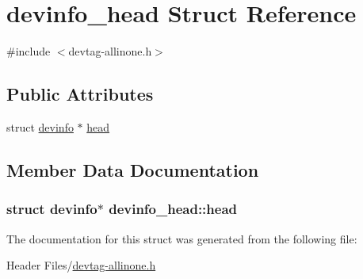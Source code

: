 \hypertarget{structdevinfo__head}{\section{devinfo\-\_\-head \-Struct \-Reference}
\label{structdevinfo__head}
}


{\ttfamily \#include $<$devtag-\/allinone.\-h$>$}

\subsection*{\-Public \-Attributes}
\begin{DoxyCompactItemize}
\item 
struct \hyperlink{structdevinfo}{devinfo} $\ast$ \hyperlink{structdevinfo__head_a17d6f51581ff5e86b8f8556c2a9cd530}{head}
\end{DoxyCompactItemize}


\subsection{\-Member \-Data \-Documentation}
\hypertarget{structdevinfo__head_a17d6f51581ff5e86b8f8556c2a9cd530}{
\subsubsection[{head}]{\setlength{\rightskip}{0pt plus 5cm}struct {\bf devinfo}$\ast$ {\bf devinfo\-\_\-head\-::head}}}\label{structdevinfo__head_a17d6f51581ff5e86b8f8556c2a9cd530}


\-The documentation for this struct was generated from the following file\-:\begin{DoxyCompactItemize}
\item 
\-Header Files/\hyperlink{devtag-allinone_8h}{devtag-\/allinone.\-h}\end{DoxyCompactItemize}
